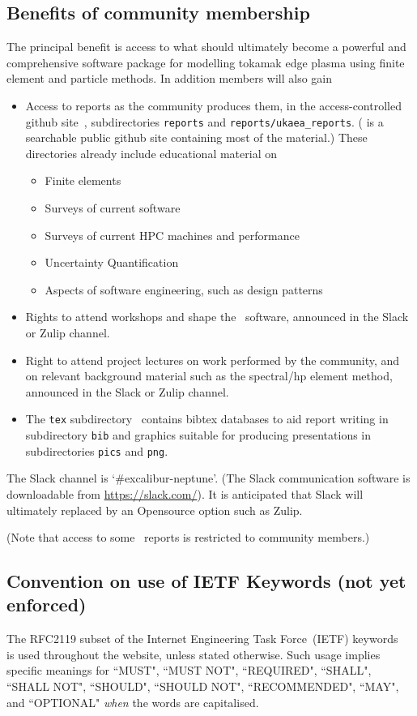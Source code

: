 \subsection{Benefits of community membership}
The principal benefit is access to what should ultimately become a powerful 
and comprehensive software package for modelling tokamak edge plasma using
finite element and particle methods.
In addition members will also gain
\begin{itemize}
\item Access to reports as the community produces them, in the access-controlled github site~\cite{xpndocswebsite},
subdirectories {\tt reports} and {\tt reports/ukaea\_reports}. (\cite{neptunesearchwebsite} is  a searchable public github site
containing most of the material.)
These directories already include educational material on
\begin{itemize}
\item Finite elements
\item Surveys of current software
\item Surveys of current HPC machines and performance
\item Uncertainty Quantification
\item Aspects of software engineering, such as design patterns
\end{itemize}
\item Rights to attend workshops and shape the \nep\ software, announced in the Slack or Zulip channel.
\item Right to attend project lectures on work performed by the community, and on
relevant background material such as the spectral/hp element method, announced in the Slack or Zulip channel.
\item The {\tt tex} subdirectory~\cite{xpntexwebsite} contains bibtex databases to aid report writing in subdirectory {\tt bib} and graphics suitable for producing presentations
in subdirectories {\tt pics} and {\tt png}.
\end{itemize}
The Slack channel is `\#excalibur-neptune'. (The Slack communication
software is downloadable from \url{https://slack.com/}).
It is anticipated that Slack will ultimately replaced by an Opensource option such as Zulip.

(Note that access to some \nep \ reports is restricted to community members.)

\subsection{Convention on use of IETF Keywords (not yet enforced)}
The RFC2119 subset of the Internet Engineering Task Force~(IETF) keywords~\cite{rfc2119}
is used throughout the website, unless stated otherwise. Such usage implies specific
meanings for ``MUST", ``MUST NOT", ``REQUIRED", ``SHALL", ``SHALL
NOT", ``SHOULD", ``SHOULD NOT", ``RECOMMENDED",  ``MAY", and ``OPTIONAL"
\emph{when} the words are capitalised.

%

